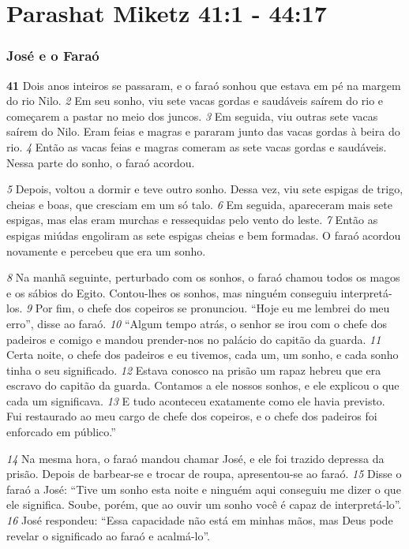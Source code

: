 \section{Parashat Miketz 41:1 - 44:17}

   
\subsubsection*{José e o Faraó}

\textbf{\large 41}
 Dois anos inteiros se passaram, e o faraó sonhou que estava em pé na
margem do rio Nilo. 
\textit{\tiny 2} 
Em seu sonho, viu sete vacas gordas e saudáveis saírem do
rio e começarem a pastar no meio dos juncos. 
\textit{\tiny 3} 
Em seguida, viu outras sete vacas
saírem do Nilo. Eram feias e magras e pararam junto das vacas gordas à beira do
rio. 
\textit{\tiny 4} 
Então as vacas feias e magras comeram as sete vacas gordas e saudáveis.
Nessa parte do sonho, o faraó acordou. 

\bigskip   
\textit{\tiny 5}
Depois, voltou a dormir e teve outro sonho. Dessa vez, viu sete espigas de trigo,
cheias e boas, que cresciam em um só talo. 
\textit{\tiny 6} 
Em seguida, apareceram mais sete
espigas, mas elas eram murchas e ressequidas pelo vento do leste. 
\textit{\tiny 7} 
Então as
espigas miúdas engoliram as sete espigas cheias e bem formadas. O faraó acordou
novamente e percebeu que era um sonho.
 
\bigskip   
\textit{\tiny 8}
Na manhã seguinte, perturbado com os sonhos, o faraó chamou todos os
magos e os sábios do Egito. Contou-lhes os sonhos, mas ninguém conseguiu
interpretá-los. 
\textit{\tiny 9}
Por fim, o chefe dos copeiros se pronunciou. “Hoje eu me lembrei do meu
erro”, disse ao faraó. 
\textit{\tiny 10}
“Algum tempo atrás, o senhor se irou com o chefe dos
padeiros e comigo e mandou prender-nos no palácio do capitão da guarda.
\textit{\tiny 11}
Certa noite, o chefe dos padeiros e eu tivemos, cada um, um sonho, e cada
sonho tinha o seu significado. 
\textit{\tiny 12}
Estava conosco na prisão um rapaz hebreu que
era escravo do capitão da guarda. Contamos a ele nossos sonhos, e ele explicou o
que cada um significava. 
\textit{\tiny 13}
E tudo aconteceu exatamente como ele havia previsto.
Fui restaurado ao meu cargo de chefe dos copeiros, e o chefe dos padeiros foi
enforcado em público.”

\bigskip   
\textit{\tiny 14}
Na mesma hora, o faraó mandou chamar José, e ele foi trazido depressa da
prisão. Depois de barbear-se e trocar de roupa, apresentou-se ao faraó. 
\textit{\tiny 15}
Disse o
faraó a José: “Tive um sonho esta noite e ninguém aqui conseguiu me dizer o que
ele significa. Soube, porém, que ao ouvir um sonho você é capaz de interpretá-lo”.
\textit{\tiny 16}
José respondeu: “Essa capacidade não está em minhas mãos, mas Deus pode
revelar o significado ao faraó e acalmá-lo”.

